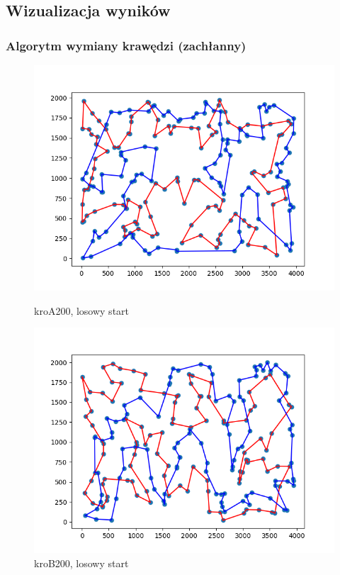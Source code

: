 \documentclass[11pt]{article}
\begin{document}
\subsection{Wizualizacja wyników}\label{subsec:wizualizacja-wynikow}

\subsubsection{Algorytm wymiany krawędzi (zachłanny)}
\begin{figure}[H]
    \centering
    \begin{minipage}[t]{0.45\textwidth}
        \centering
        \includegraphics[width=\linewidth]{best_paths/kroA200/traverse_greedy_edge/randomstart}
        \caption{kroA200, losowy start}
    \end{minipage}
    \hfill
    \begin{minipage}[t]{0.45\textwidth}
        \centering
        \includegraphics[width=\linewidth]{best_paths/kroB200/traverse_greedy_edge/randomstart}
        \caption{kroB200, losowy start}
    \end{minipage}


\end{figure}
\end{document}
